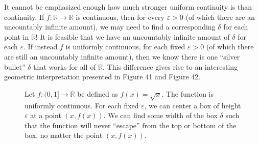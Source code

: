 \documentclass{article}
\newcommand{\R}{\mathbb{R}}
\theoremstyle{definition}
\begin{document}
It cannot be emphasized enough how much stronger uniform continuity is than continuity. If $ f:\R\to\R $ is continuous, then for every $ \varepsilon>0 $ (of which there are an uncountably infinite amount), we may need to find a corresponding $ \delta $ for each point in $ \R $! It is feasible that we have an uncountably infinite amount of $ \delta $ for each $ \varepsilon $. If instead $ f $ is uniformly continuous, for each fixed $ \varepsilon>0 $ (of which there are still an uncountably infinite amount), then we know there is one ``silver bullet'' $ \delta $ that works for all of $ \R $. This difference gives rise to an interesting geometric interpretation presented in Figure 41 and Figure 42. 
\begin{figure}[h!]
	\centering
	\caption{Let $ f:(0,1]\to\R $ be defined as $ f(x)=\sqrt{x} $. The function is uniformly continuous. For each fixed $ \varepsilon $, we can center a box of height $ \varepsilon $ at a point $ (x,f(x)) $. We can find some width of the box $ \delta $ such that the function will never ``escape'' from the top or bottom of the box, no matter the point $ (x,f(x)) $.}
\end{figure}
\end{document}

